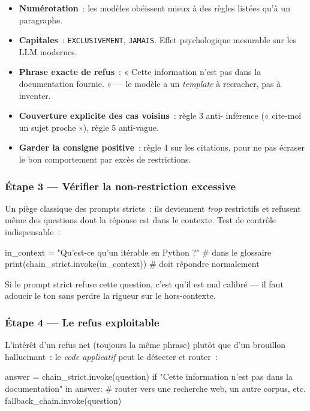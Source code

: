 \documentclass[11pt,a4paper]{article}
\begin{document}
\begin{itemize}[leftmargin=*]
  \item \textbf{Numérotation}~: les modèles obéissent mieux à des règles
        listées qu'à un paragraphe.
  \item \textbf{Capitales}~: \texttt{EXCLUSIVEMENT}, \texttt{JAMAIS}.
        Effet psychologique mesurable sur les LLM modernes.
  \item \textbf{Phrase exacte de refus}~: « Cette information n'est pas
        dans la documentation fournie. » — le modèle a un \emph{template}
        à recracher, pas à inventer.
  \item \textbf{Couverture explicite des cas voisins}~: règle 3 anti-
        inférence (« cite-moi un sujet proche »), règle 5 anti-vague.
  \item \textbf{Garder la consigne positive}~: règle 4 sur les citations,
        pour ne pas écraser le bon comportement par excès de restrictions.
\end{itemize}

\subsubsection*{Étape 3 — Vérifier la non-restriction excessive}

Un piège classique des prompts stricts~: ils deviennent \emph{trop}
restrictifs et refusent même des questions dont la réponse est dans
le contexte. Test de contrôle indispensable~:

\begin{pythoncode}
in_context = "Qu'est-ce qu'un itérable en Python ?"      # dans le glossaire
print(chain_strict.invoke(in_context))                   # doit répondre normalement
\end{pythoncode}

Si le prompt strict refuse cette question, c'est qu'il est mal calibré
— il faut adoucir le ton sans perdre la rigueur sur le hors-contexte.

\subsubsection*{Étape 4 — Le refus exploitable}

L'intérêt d'un refus net (toujours la même phrase) plutôt que d'un
brouillon hallucinant~: le \emph{code applicatif} peut le détecter
et router~:

\begin{pythoncode}
answer = chain_strict.invoke(question)
if "Cette information n'est pas dans la documentation" in answer:
    # router vers une recherche web, un autre corpus, etc.
    fallback_chain.invoke(question)
\end{pythoncode}
\end{document}

